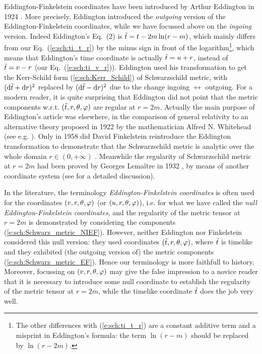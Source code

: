 \begin{hist}
Eddington-Finkelstein coordinates have been introduced by
Arthur Eddington in 1924 \cite{Eddin1924}. More precisely, Eddington
introduced the \emph{outgoing} version of the Eddington-Finkelstein coordinates,
while we have focussed above on the \emph{ingoing} version. Indeed
Eddington's Eq.~(2) is ${\tilde t} = t - 2m \ln(r-m)$, which mainly differs from
our Eq.~(\ref{e:sch:ti_t_r}) by the minus sign in front of the logarithm\footnote{The other differences with (\ref{e:sch:ti_t_r}) are a constant additive term
and a misprint in Eddington's formula: the term $\ln(r-m)$ should be replaced
by $\ln(r-2m)$.},
which means that Eddington's time coordinate is actually ${\tilde t} = u + r$, instead of
${\tilde t} = v - r$ (our Eq.~(\ref{e:sch:ti_v_r})). Eddington used his transformation
to get the Kerr-Schild form (\ref{e:sch:Kerr_Schild}) of Schwarzschild metric,
with $(\mathrm{d} {\tilde t} + \mathrm{d} r)^2$ replaced by $(\mathrm{d} {\tilde t} - \mathrm{d} r)^2$ due to the change
ingoing $\leftrightarrow$ outgoing. For a modern reader, it is quite surprising
that Eddington did not point that the metric components w.r.t. $({\tilde t},r,\theta,\varphi)$
are regular at $r=2m$. Actually the main purpose of Eddington's article
\cite{Eddin1924} was elsewhere, in the comparison of general relativity to an alternative theory proposed in 1922 by the mathematician Alfred N. Whitehead
(see e.g. \cite{GibboW08}).
Only in 1958 did David Finkelstein reintroduce the Eddington transformation
to demonstrate that the Schwarzschild metric is analytic over the whole domain
$r\in(0,+\infty)$ \cite{Finke58}. Meanwhile the regularity of Schwarzschild metric
at $r=2m$ had been proved by Georges Lemaître in 1932 \cite{Lemai32}, by means of
another coordinate system (see \cite{Eisen93} for a detailed discussion).
\end{hist}

\begin{remark}
In the literature, the terminology \emph{Eddington-Finkelstein coordinates}
is often used for the coordinates $(v,r,\theta,\varphi)$ (or $(u,r,\theta,\varphi)$),
i.e. for what we have called the \emph{null Eddington-Finkelstein coordinates},
and the regularity of the metric tensor at $r=2m$ is demonstrated by
considering the components (\ref{e:sch:Schwarz_metric_NIEF}).
However, neither
Eddington \cite{Eddin1924} nor Finkelstein \cite{Finke58}
considered this null version: they used coordinates $({\tilde t},r,\theta,\varphi)$, where
${\tilde t}$ is timelike and they exhibited (the outgoing version of) the
metric components (\ref{e:sch:Schwarz_metric_EF}).
Hence our terminology is more faithfull to history. Moreover, focussing on
$(v,r,\theta,\varphi)$ may give the false impression to a novice reader that it is
necessary to introduce some null coordinate to establish the regularity
of the metric tensor at $r=2m$, while the timelike coordinate ${\tilde t}$
does the job very well.
\end{remark}

